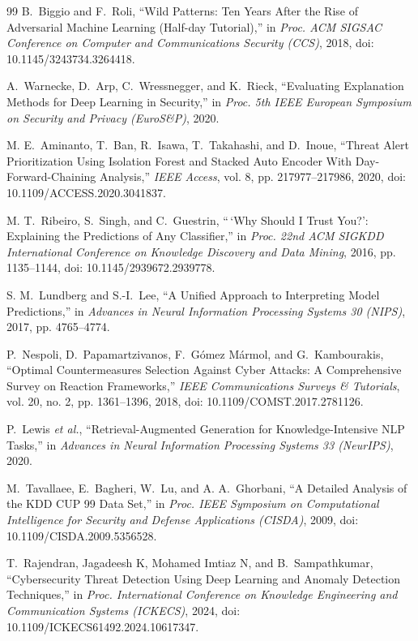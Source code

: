 \documentclass[conference]{IEEEtran}
\begin{document}
\begin{thebibliography}{99}
 B.~Biggio and F.~Roli, ``Wild Patterns: Ten Years After the Rise of Adversarial Machine Learning (Half-day Tutorial),'' in \emph{Proc. ACM SIGSAC Conference on Computer and Communications Security (CCS)}, 2018, doi: 10.1145/3243734.3264418.

 A.~Warnecke, D.~Arp, C.~Wressnegger, and K.~Rieck, ``Evaluating Explanation Methods for Deep Learning in Security,'' in \emph{Proc. 5th IEEE European Symposium on Security and Privacy (EuroS\&P)}, 2020.

 M. E.~Aminanto, T.~Ban, R.~Isawa, T.~Takahashi, and D.~Inoue, ``Threat Alert Prioritization Using Isolation Forest and Stacked Auto Encoder With Day-Forward-Chaining Analysis,'' \emph{IEEE Access}, vol. 8, pp. 217977--217986, 2020, doi: 10.1109/ACCESS.2020.3041837.

 M. T.~Ribeiro, S.~Singh, and C.~Guestrin, ``\,`{Why} Should {I} Trust You?': Explaining the Predictions of Any Classifier,'' in \emph{Proc. 22nd ACM SIGKDD International Conference on Knowledge Discovery and Data Mining}, 2016, pp. 1135--1144, doi: 10.1145/2939672.2939778.

 S. M.~Lundberg and S.-I.~Lee, ``A Unified Approach to Interpreting Model Predictions,'' in \emph{Advances in Neural Information Processing Systems 30 (NIPS)}, 2017, pp. 4765--4774.

 P.~Nespoli, D.~Papamartzivanos, F.~G\'{o}mez M\'{a}rmol, and G.~Kambourakis, ``Optimal Countermeasures Selection Against Cyber Attacks: A Comprehensive Survey on Reaction Frameworks,'' \emph{IEEE Communications Surveys \& Tutorials}, vol. 20, no. 2, pp. 1361--1396, 2018, doi: 10.1109/COMST.2017.2781126.

 P.~Lewis \emph{et al.}, ``Retrieval-Augmented Generation for Knowledge-Intensive {NLP} Tasks,'' in \emph{Advances in Neural Information Processing Systems 33 (NeurIPS)}, 2020.

 M.~Tavallaee, E.~Bagheri, W.~Lu, and A. A.~Ghorbani, ``A Detailed Analysis of the {KDD CUP} 99 Data Set,'' in \emph{Proc. IEEE Symposium on Computational Intelligence for Security and Defense Applications (CISDA)}, 2009, doi: 10.1109/CISDA.2009.5356528.

 T.~Rajendran, Jagadeesh K, Mohamed Imtiaz N, and B.~Sampathkumar, ``Cybersecurity Threat Detection Using Deep Learning and Anomaly Detection Techniques,'' in \emph{Proc. International Conference on Knowledge Engineering and Communication Systems (ICKECS)}, 2024, doi: 10.1109/ICKECS61492.2024.10617347.


\end{thebibliography}
\end{document}

